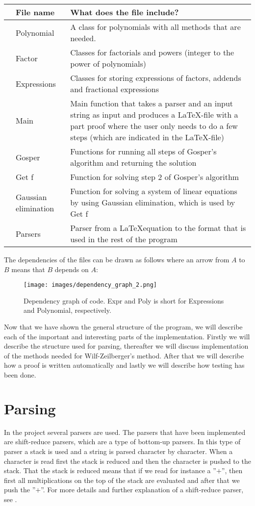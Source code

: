 \begin{center}
  \begin{tabular}{C{1mm}C{3cm}|C{8cm}}
    &\textbf{File name}   & \textbf{What does the file include?} \\ \hline
    &Polynomial  & A class for polynomials with all methods that are needed. \\ \hline
    &Factor      & Classes for factorials and powers (integer to the power of polynomials) \\ \hline
    &Expressions & Classes for storing expressions of factors, addends and fractional expressions \\ \hline
    &Main        & Main function that takes a parser and an input string as input and produces a \LaTeX-file with a part proof where the user only needs to do a few steps (which are indicated in the \LaTeX-file) \\ \hline
    &Gosper      & Functions for running all steps of Gosper's algorithm and returning the solution \\ \hline
    &Get f       & Function for solving step 2 of Gosper's algorithm \\ \hline
    &Gaussian elimination & Function for solving a system of linear equations by using Gaussian elimination, which is used by Get f \\ \hline
    &Parsers     & Parser from a \LaTeX equation to the format that is used in the rest of the program \\
  \end{tabular}
\end{center}

The dependencies of the files can be drawn as follows where an arrow from $A$ to $B$ means that $B$ depends on $A$:
\begin{figure}[H]
\centering
\texttt{[image: images/dependency\_graph\_2.png]}
\caption{Dependency graph of code. Expr and Poly is short for Expressions and Polynomial, respectively.}
\label{Fig: DepGraph}
\end{figure}
Now that we have shown the general structure of the program, we will describe each of the important and interesting parts of the implementation. Firstly we will describe the structure used for parsing, thereafter we will discuss implementation of the methods needed for Wilf-Zeilberger's method. After that we will describe how a proof is written automatically and lastly we will describe how testing has been done.

\section{Parsing}
In the project several parsers are used. The parsers that have been implemented are shift-reduce parsers, which are a type of bottom-up parsers. In this type of parser a stack is used and a string is parsed character by character. When a character is read first the stack is reduced and then the character is pushed to the stack. That the stack is reduced means that if we read for instance a ''$+$'', then first all multiplications on the top of the stack are evaluated and after that we push the ''$+$''. For more details and further explanation of a shift-reduce parser, see .

